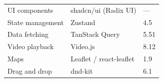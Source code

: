 \begin{table}[htbp]
\begin{tabular}{lll}
UI components       & shadcn/ui (Radix UI)    & ---               \\
State management    & Zustand                 & 4.5               \\
Data fetching       & TanStack Query          & 5.51              \\
Video playback      & Video.js                & 8.12              \\
Maps                & Leaflet / react-leaflet & 1.9               \\
Drag and drop       & dnd-kit                 & 6.1               \\ \hline
\end{tabular}
\end{table}

